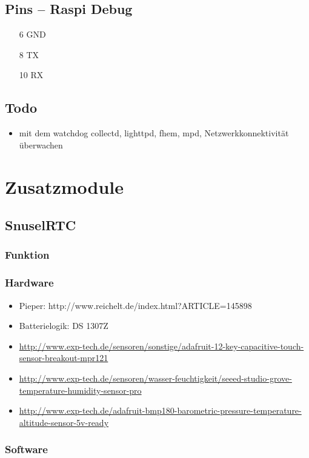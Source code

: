 \documentclass[a4paper,twoside,titlepage,normalheadings,tocleft,bibtotoc]{scrartcl}
\begin{document}
\subsection{Pins -- Raspi Debug}
\begin{itemize}
\item[6] GND
\item[8] TX
\item[10] RX
\end{itemize}

\subsection{Todo}
\begin{itemize}
\item mit dem watchdog collectd, lighttpd, fhem, mpd, Netzwerkkonnektivität überwachen
\end{itemize}



\section{Zusatzmodule}
\subsection{SnuselRTC}
\subsubsection{Funktion}
\subsubsection{Hardware}
\begin{itemize}
\item Pieper: http://www.reichelt.de/index.html?ARTICLE=145898
\item Batterielogik: DS 1307Z
\item \url{http://www.exp-tech.de/sensoren/sonstige/adafruit-12-key-capacitive-touch-sensor-breakout-mpr121}
\item \url{http://www.exp-tech.de/sensoren/wasser-feuchtigkeit/seeed-studio-grove-temperature-humidity-sensor-pro}
\item \url{http://www.exp-tech.de/adafruit-bmp180-barometric-pressure-temperature-altitude-sensor-5v-ready}
\end{itemize}

\subsubsection{Software}
\end{document}
